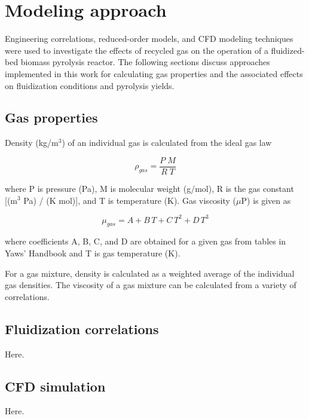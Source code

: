 
\section{Modeling approach}

Engineering correlations, reduced-order models, and CFD modeling techniques were used to investigate the effects of recycled gas on the operation of a fluidized-bed biomass pyrolysis reactor. The following sections discuss approaches implemented in this work for calculating gas properties and the associated effects on fluidization conditions and pyrolysis yields.

\subsection{Gas properties}

Density (kg/m$^3$) of an individual gas is calculated from the ideal gas law

\begin{equation}
    \rho_{gas} = \frac{P\;M}{R\;T}
\end{equation}

\noindent where P is pressure (Pa), M is molecular weight (g/mol), R is the gas constant [(m$^3$ Pa) / (K mol)], and T is temperature (K). Gas viscosity ($\mu$P) is given as

\begin{equation}
    \mu_{gas} = A + B\,T + C\,T^2 + D\,T^3
\end{equation}

\noindent where coefficients A, B, C, and D are obtained for a given gas from tables in Yaws' Handbook and T is gas temperature (K).

For a gas mixture, density is calculated as a weighted average of the individual gas densities. The viscosity of a gas mixture can be calculated from a variety of correlations.

\subsection{Fluidization correlations}

Here.

\subsection{CFD simulation}

Here.

